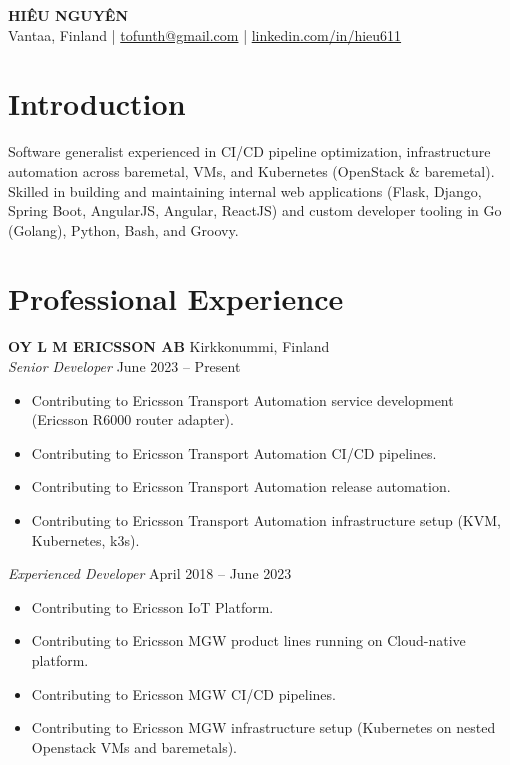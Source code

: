 \documentclass[10pt,a4paper]{article}
\begin{document}
\begin{center}
    {\LARGE \bfseries \color{primary} HIÊU NGUYÊN} \\[3pt]
    \color{secondary}\small
    Vantaa, Finland \quad|\quad
    \href{mailto:tofunth@gmail.com}{tofunth@gmail.com} \quad|\quad
    \href{https://www.linkedin.com/in/hieu611}{linkedin.com/in/hieu611}
\end{center}

\vspace{-4pt}

\section*{Introduction}
\small
Software generalist experienced in CI/CD pipeline optimization, infrastructure automation across baremetal, VMs, and Kubernetes (OpenStack \& baremetal). Skilled in building and maintaining internal web applications (Flask, Django, Spring Boot, AngularJS, Angular, ReactJS) and custom developer tooling in Go (Golang), Python, Bash, and Groovy.

\section*{Professional Experience}
\small

\textbf{OY L M ERICSSON AB} \hfill Kirkkonummi, Finland \\
\textit{Senior Developer} \hfill June 2023 -- Present
\begin{itemize}
    \item Contributing to Ericsson Transport Automation service development (Ericsson R6000 router adapter).
    \item Contributing to Ericsson Transport Automation CI/CD pipelines.
    \item Contributing to Ericsson Transport Automation release automation.
    \item Contributing to Ericsson Transport Automation infrastructure setup (KVM, Kubernetes, k3s).
\end{itemize}

\vspace{2pt}
\textit{Experienced Developer} \hfill April 2018 -- June 2023
\begin{itemize}
    \item Contributing to Ericsson IoT Platform.
    \item Contributing to Ericsson MGW product lines running on Cloud-native platform.
    \item Contributing to Ericsson MGW CI/CD pipelines.
    \item Contributing to Ericsson MGW infrastructure setup (Kubernetes on nested Openstack VMs and baremetals).
\end{itemize}
\end{document}
